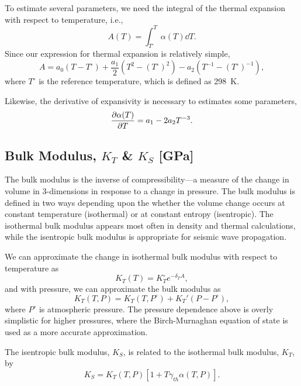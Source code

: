 To estimate several parameters, we need the integral of the thermal expansion
with respect to temperature, i.e.,
\begin{equation}
    A(T) = \int_{T^\circ}^T \alpha(T) \dd{T}.
    \label{eq:ialpha}
\end{equation}
Since our expression for thermal expansion is relatively simple,
\begin{equation}
    A = a_{0}(T - T^\circ)
    + \frac{a_{1}}{2}(T^2 - (T^\circ)^2)
    - a_{2}(T^{-1} - (T^\circ)^{-1}),
\end{equation}
where $T^\circ$ is the reference temperature, which is defined as 298~K.

Likewise, the derivative of expansivity is necessary to estimates some
parameters,
\begin{equation}
    \pdv{\alpha(T)}{T} = a_{1} - 2 a_{2} T^{-3} .
\end{equation}


\subsection{Bulk Modulus, $K_T$ \& $K_S$ [GPa]} \label{sec:bulk_modulus}
The bulk modulus is the inverse of compressibility---a measure of the
change in volume in 3-dimensions in response to a change in pressure.  The bulk
modulus is defined in two ways depending upon the whether the volume change
occurs at constant temperature (isothermal) or at constant entropy (isentropic).
The isothermal bulk modulus appears most often in density and thermal calculations,
while the isentropic bulk modulus is appropriate for seismic wave propagation.

We can approximate the change in isothermal bulk modulus with respect to
temperature as
\begin{equation}
    K_T(T) = K_T^\circ e^{-\delta_T A} ,
\end{equation}
and with pressure, we can approximate the bulk modulus as
\begin{equation}
    K_T(T,P) = K_T(T,P^\circ) + K_T'(P - P^\circ),
\end{equation}
where $P^\circ$ is atmospheric pressure.  The pressure dependence above is
overly simplistic for higher pressures, where the Birch-Murnaghan equation of
state is used as a more accurate approximation.

The isentropic bulk modulus, $K_S$, is related to the isothermal bulk modulus,
$K_T$, by
\begin{equation}
    K_S = K_T(T,P) [1 + T \gamma_{th} \alpha(T,P)].
\end{equation}


